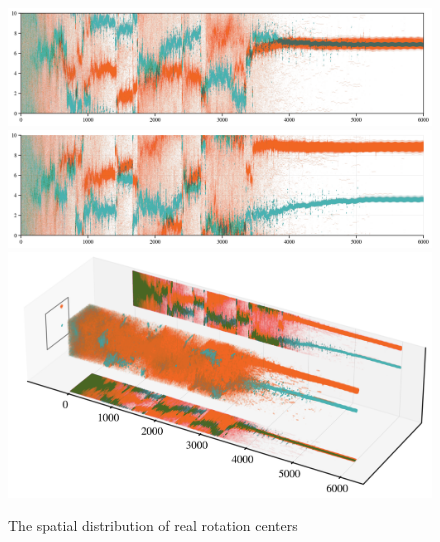 \documentclass{article}
\begin{document}
\begin{figure}[H]
    \centering
    \includegraphics[width=1\textwidth]{figs/centersX.png}
    \includegraphics[width=1\textwidth]{figs/centersY.png}
    \includegraphics[width=1\textwidth]{figs/3d2.png}
    \caption{The spatial distribution of real rotation centers}
\end{figure}

\newpage
\end{document}
